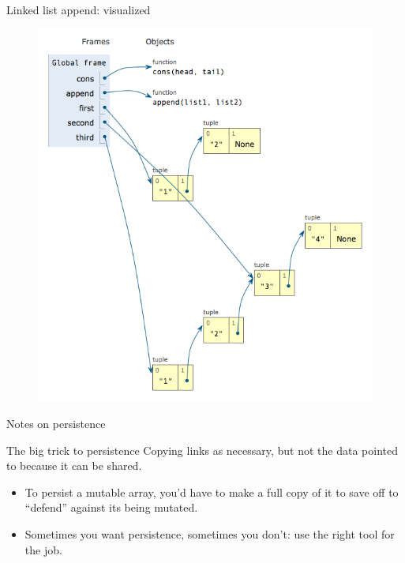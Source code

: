 \begin{frame}{Linked list append: visualized}
  \begin{figure}
    \includegraphics[height=0.8\textheight]{lists2.png}
  \end{figure}
\end{frame}

\begin{frame}{Notes on persistence}
  \begin{block}{The big trick to persistence}
    Copying links as necessary, but not the data pointed to because it
    can be shared.
  \end{block}

  \begin{itemize}
  \item To persist a mutable array, you'd have to make a full copy of
    it to save off to ``defend'' against its being mutated.
  \item Sometimes you want persistence, sometimes you don't: use the
    right tool for the job.
  \end{itemize}
\end{frame}

